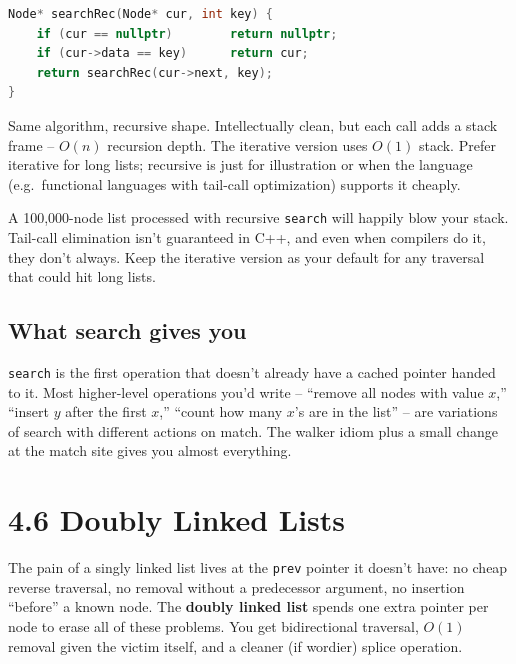 \documentclass[11pt]{article}
\begin{document}
\begin{examplebox}
\begin{lstlisting}[basicstyle=\ttfamily\small,frame=single,language=C++]
Node* searchRec(Node* cur, int key) {
    if (cur == nullptr)        return nullptr;
    if (cur->data == key)      return cur;
    return searchRec(cur->next, key);
}
\end{lstlisting}
Same algorithm, recursive shape. Intellectually clean, but each
call adds a stack frame -- $O(n)$ recursion depth. The iterative
version uses $O(1)$ stack. Prefer iterative for long lists;
recursive is just for illustration or when the language
(e.g.\ functional languages with tail-call optimization) supports
it cheaply.
\end{examplebox}

\begin{warnbox}
A 100{,}000-node list processed with recursive \texttt{search} will
happily blow your stack. Tail-call elimination isn't guaranteed in
C++, and even when compilers do it, they don't always. Keep the
iterative version as your default for any traversal that could hit
long lists.
\end{warnbox}

\subsection{What search gives you}

\begin{ideabox}
\texttt{search} is the first operation that doesn't already have a
cached pointer handed to it. Most higher-level operations you'd
write -- ``remove all nodes with value $x$,'' ``insert $y$ after
the first $x$,'' ``count how many $x$'s are in the list'' -- are
variations of search with different actions on match. The walker
idiom plus a small change at the match site gives you almost
everything.
\end{ideabox}

\section{4.6 Doubly Linked Lists}

The pain of a singly linked list lives at the \texttt{prev}
pointer it doesn't have: no cheap reverse traversal, no removal
without a predecessor argument, no insertion ``before'' a known
node. The \textbf{doubly linked list} spends one extra pointer per
node to erase all of these problems. You get bidirectional
traversal, $O(1)$ removal given the victim itself, and a cleaner
(if wordier) splice operation.
\end{document}
